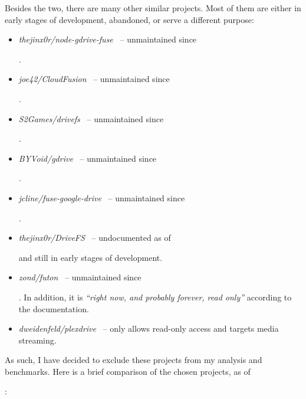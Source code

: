 Besides the two, there are many other similar projects. Most of them are either in early stages of development, abandoned, or serve a different purpose:

\begin{itemize}
  \itemsep0em
  \item \emph{thejinx0r/node-gdrive-fuse}~\cite{thejinx0r/node-gdrive-fuse} -- unmaintained since \date{February 2016}.
  \item \emph{joe42/CloudFusion}~\cite{joe42/CloudFusion} -- unmaintained since \date{January 2015}.
  \item \emph{S2Games/drivefs}~\cite{S2Games/drivefs} -- unmaintained since \date{June 2014}.
  \item \emph{BYVoid/gdrive}~\cite{BYVoid/gdrive} -- unmaintained since \date{October 2013}.
  \item \emph{jcline/fuse-google-drive}~\cite{jcline/fuse-google-drive} -- unmaintained since \date{September 2012}.
  \item \emph{thejinx0r/DriveFS}~\cite{thejinx0r/DriveFS} -- undocumented as of \date{June 2018} and still in early stages of development.
  \item \emph{zond/futon}~\cite{zond/futon} -- unmaintained since \date{December 2014}. In addition, it is \emph{``right now, and probably forever, read only''} according to the documentation.
  \item \emph{dweidenfeld/plexdrive}~\cite{dweidenfeld/plexdrive} -- only allows read-only access and targets media streaming.
\end{itemize}

As such, I have decided to exclude these projects from my analysis and benchmarks. Here is a brief comparison of the chosen projects, as of \date{21 June 2018}:

\vspace{1em}

